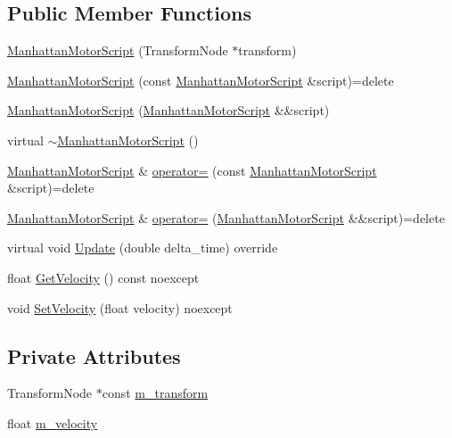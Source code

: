 \subsection*{Public Member Functions}
\begin{DoxyCompactItemize}
\item 
\hyperlink{classmage_1_1_manhattan_motor_script_a6a40360d3b1603e8e5fc64a230ed7574}{Manhattan\+Motor\+Script} (Transform\+Node $\ast$transform)
\item 
\hyperlink{classmage_1_1_manhattan_motor_script_a890f4456d4707e6eb33e43837b26e536}{Manhattan\+Motor\+Script} (const \hyperlink{classmage_1_1_manhattan_motor_script}{Manhattan\+Motor\+Script} \&script)=delete
\item 
\hyperlink{classmage_1_1_manhattan_motor_script_ae573b594372f184a524c6c9f35517fae}{Manhattan\+Motor\+Script} (\hyperlink{classmage_1_1_manhattan_motor_script}{Manhattan\+Motor\+Script} \&\&script)
\item 
virtual \hyperlink{classmage_1_1_manhattan_motor_script_a86d4f8c4ba0aa94358ea2bc77f9a2a69}{$\sim$\+Manhattan\+Motor\+Script} ()
\item 
\hyperlink{classmage_1_1_manhattan_motor_script}{Manhattan\+Motor\+Script} \& \hyperlink{classmage_1_1_manhattan_motor_script_a563d4d429bbcabf25f57539857dde53c}{operator=} (const \hyperlink{classmage_1_1_manhattan_motor_script}{Manhattan\+Motor\+Script} \&script)=delete
\item 
\hyperlink{classmage_1_1_manhattan_motor_script}{Manhattan\+Motor\+Script} \& \hyperlink{classmage_1_1_manhattan_motor_script_a944149dc06764bc23feffde4de100679}{operator=} (\hyperlink{classmage_1_1_manhattan_motor_script}{Manhattan\+Motor\+Script} \&\&script)=delete
\item 
virtual void \hyperlink{classmage_1_1_manhattan_motor_script_aa2aee651ef777e71ac8da8345f86b212}{Update} (double delta\+\_\+time) override
\item 
float \hyperlink{classmage_1_1_manhattan_motor_script_a4df8eb1593f7fd3e131de44caa3ac1e1}{Get\+Velocity} () const noexcept
\item 
void \hyperlink{classmage_1_1_manhattan_motor_script_a01f227fa82d78b0be767948c2103d727}{Set\+Velocity} (float velocity) noexcept
\end{DoxyCompactItemize}
\subsection*{Private Attributes}
\begin{DoxyCompactItemize}
\item 
Transform\+Node $\ast$const \hyperlink{classmage_1_1_manhattan_motor_script_a87af31ce6376830ed040b19d78da386e}{m\+\_\+transform}
\item 
float \hyperlink{classmage_1_1_manhattan_motor_script_a824893c374fa6f271a964751dc1a59ec}{m\+\_\+velocity}
\end{DoxyCompactItemize}
